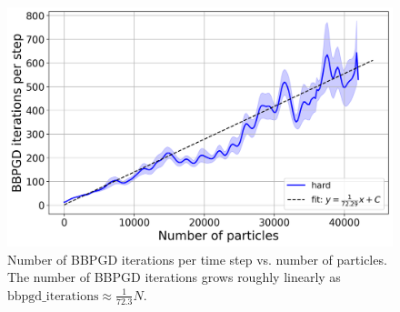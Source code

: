 \documentclass[conference]{IEEEtran}
\begin{document}
\begin{figure}[h]
    \centering
    \includegraphics[width=\linewidth]{figures/comparison_plots/combined_bbpgd_iterations_per_step_vs_num_particles_with_fit.png}
    \caption{Number of BBPGD iterations per time step vs. number of particles. The number of BBPGD iterations grows roughly linearly as $\text{bbpgd\_iterations} \approx  \frac{1}{72.3} N$.}
    \label{fig:bbpgd_iterations_per_step_vs_num_particles}
\end{figure}
\end{document}
